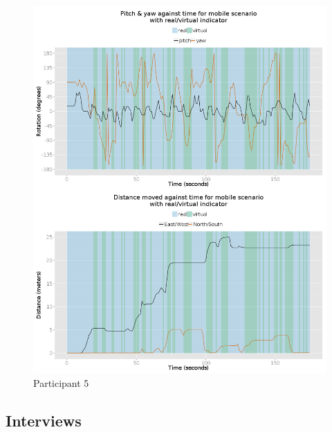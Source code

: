 \documentclass[oneside]{book}
\begin{document}
\begin{figure}[h]
	\begin{center}
		\includegraphics[width=\linewidth]{images/29082014_1350_2up.png}
		\caption{Participant 5}
		\label{participant_5_2up}
	\end{center}
\end{figure}


\pagebreak

\subsection{Interviews}





\appendix
\end{document}
